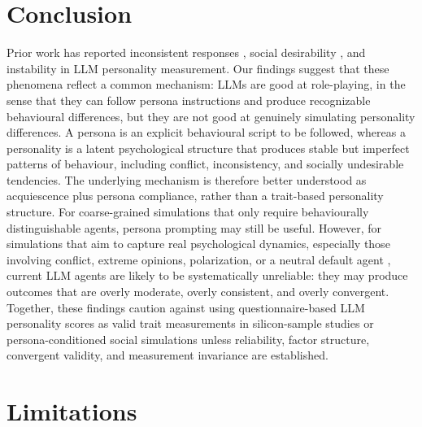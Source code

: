 \documentclass[11pt]{article}
\begin{document}


\section{Conclusion}

Prior work has reported inconsistent responses \citep{suhr2025challenging}, social desirability \citep{acerbi2024llm}, and instability \citep{pelet2025persistent} in LLM personality measurement. Our findings suggest that these phenomena reflect a common mechanism: LLMs are good at role-playing, in the sense that they can follow persona instructions and produce recognizable behavioural differences, but they are not good at genuinely simulating personality differences. A persona is an explicit behavioural script to be followed, whereas a personality is a latent psychological structure that produces stable but imperfect patterns of behaviour, including conflict, inconsistency, and socially undesirable tendencies. The underlying mechanism is therefore better understood as acquiescence plus persona compliance, rather than a trait-based personality structure. For coarse-grained simulations that only require behaviourally distinguishable agents, persona prompting may still be useful. However, for simulations that aim to capture real psychological dynamics, especially those involving conflict, extreme opinions, polarization, or a neutral default agent \citep{larooij2025validation}, current LLM agents are likely to be systematically unreliable: they may produce outcomes that are overly moderate, overly consistent, and overly convergent. Together, these findings caution against using questionnaire-based LLM personality scores as valid trait measurements in silicon-sample studies or persona-conditioned social simulations unless reliability, factor structure, convergent validity, and measurement invariance are established.



\section{Limitations}
\end{document}
